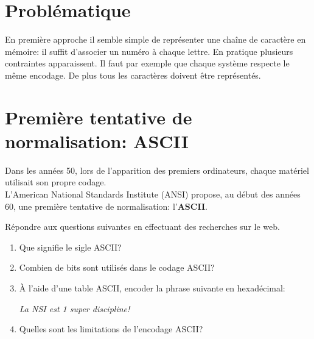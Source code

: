 \documentclass[a4paper,11pt]{article}
\begin{document}
\begin{Form}
\section{Problématique}
En première approche il semble simple de représenter une chaîne de caractère en mémoire: il suffit d'associer un numéro à chaque lettre. En pratique plusieurs contraintes apparaissent. Il faut par exemple que chaque système respecte le même encodage. De plus tous les caractères doivent être représentés.
\begin{center}
\end{center}
\section{Première tentative de normalisation: ASCII}
Dans les années 50, lors de l'apparition des premiers ordinateurs, chaque matériel utilisait son propre codage.\\L’American National Standards Institute (ANSI) propose, au début des années 60, une première tentative de normalisation: l'\textbf{ASCII}.
\begin{activite}
Répondre aux questions suivantes en effectuant des recherches sur le web.
\begin{enumerate}
\item Que signifie le sigle ASCII?
\item Combien de bits sont utilisés dans le codage ASCII?
\item À l'aide d'une table ASCII, encoder la phrase suivante en hexadécimal:
\begin{center}
\emph{La NSI est 1 super discipline!}
\end{center}
\item Quelles sont les limitations de l'encodage ASCII?
\end{enumerate}
\end{activite}

\end{Form}
\end{document}
